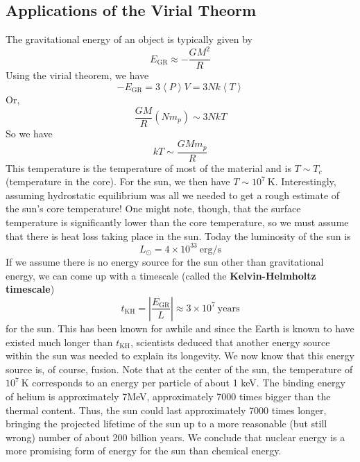 \documentclass[10pt]{article}
\numberwithin{equation}{section}
\newcommand{\norm}[1]{\left\lvert#1\right\rvert}
\newcommand{\avg}[1]{\left\langle#1\right\rangle}
\begin{document}
	\subsection{Applications of the Virial Theorm}
	The gravitational energy of an object is typically given by
	\begin{equation}
		\label{avt.1}E_{\mathrm{GR}}\approx -\frac{GM^2}{R}
	\end{equation}
	Using the virial theorem, we have
	\begin{equation}
		\label{avt.2} -E_{\mathrm{GR}}=3\avg{P}V=3Nk\avg{T}
	\end{equation}
	Or,
	\begin{equation}
		\label{avt.3} \frac{GM}{R}\left(Nm_p\right)\sim 3NkT
	\end{equation}
	So we have
	\begin{equation}
		\label{avt.4} \boxed{kT\sim \frac{GMm_p}{R}}
	\end{equation}
	This temperature is the temperature of most of the material
        and is $T\sim T_c$ (temperature in the core). For the sun, we
        then have $T\sim 10^7\ \mathrm{K}$. Interestingly, assuming
        hydrostatic equilibrium was all we needed to get a rough
        estimate of the sun's core temperature! One might note,
        though, that the surface temperature is significantly lower
        than the core temperature, so we must assume that there is
        heat loss taking place in the sun. Today the luminosity of the
        sun is
	\begin{equation}
		\label{avt.5} L_\odot = 4\times 10^{33}\ \mathrm{erg/s}
	\end{equation}
	If we assume there is no energy source for the sun other than 
gravitational energy, we can come up with a timescale (called the \textbf
{Kelvin-Helmholtz timescale})
	\begin{equation}
		\label{avt.6} t_{\mathrm{KH}}=\norm{\frac{E_{\mathrm{GR}}}{L}}
\approx 3\times 10^7\ \mathrm{years}
	\end{equation}
	for the sun. This has been known for awhile and since the Earth is 
known to have existed much longer than $t_{\mathrm{KH}}$, scientists 
deduced that another energy source within the sun was needed to explain its 
longevity. We now know that this energy source is, of course, fusion. Note 
that at the center of the sun, the temperature of $10^7\ \mathrm{K}$ 
corresponds to an energy per particle of about 1 keV. The binding energy of 
helium is approximately 7MeV, approximately 7000 times bigger than the 
thermal content. Thus, the sun could last approximately 7000 times longer, 
bringing the projected lifetime of the sun up to a more reasonable (but 
still wrong) number of about 200 billion years. We conclude that nuclear 
energy is a more promising form of energy for the sun than chemical energy.
\\
	
\end{document}
